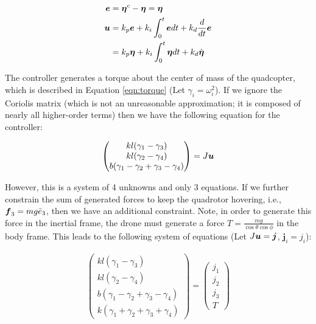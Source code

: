 \documentclass{article}
\begin{document}
\begin{align}
    \boldsymbol{e} & = \boldsymbol{\eta}^c - \boldsymbol{\eta} = \boldsymbol{\eta} \\
    \boldsymbol{u} & = k_p \boldsymbol{e} + k_i \int_0^t \boldsymbol{e} dt + k_d \frac{d }{d t} \boldsymbol{e} \\
    & = k_p \boldsymbol{\eta} + k_i \int_0^t \boldsymbol{\eta} dt + k_d \dot{\boldsymbol{\eta}}
\end{align}

The controller generates a torque about the center of mass of the quadcopter, which is described in Equation \ref{eqn:torque} (Let $\gamma_i = \omega_i^2$). If we ignore the Coriolis matrix (which is not an unreasonable approximation; it is composed of nearly all higher-order terms) then we have the following equation for the controller:

\begin{align}
    \begin{pmatrix}
        kl (\gamma_1 - \gamma_3) \\ kl (\gamma_2 - \gamma_4) \\ 
        b (\gamma_1 - \gamma_2 + \gamma_3 - \gamma_4) 
    \end{pmatrix} =
    J \boldsymbol{u}
\end{align}

\newcommand{\sj}{\boldsymbol{j}}

However, this is a system of 4 unknowns and only 3 equations. If we further constrain the sum of generated forces to keep the quadrotor hovering, i.e., $\boldsymbol{f}_3 = mg \bar{e}_3$, then we have an additional constraint. Note, in order to generate this force in the inertial frame, the drone must generate a force $T = \frac{mg}{\cos{\theta} \cos{\phi}}$ in the body frame. This leads to the following system of equations (Let $J \su = \sj$, $\sj_i = j_i$):

\begin{align}
    \begin{pmatrix}
        kl (\gamma_1 - \gamma_3) \\ kl (\gamma_2 - \gamma_4) \\ 
        b (\gamma_1 - \gamma_2 + \gamma_3 - \gamma_4) \\
        k (\gamma_1 + \gamma_2 + \gamma_3 + \gamma_4)
    \end{pmatrix} =
    \begin{pmatrix} j_1 \\ j_2 \\ j_3 \\ T \end{pmatrix}
\end{align}
\end{document}
